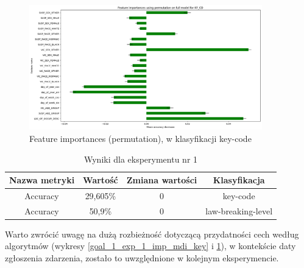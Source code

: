 \documentclass{classrep}
\begin{document}
{{{{                    \begin{figure}[!htbp]
                        \centering
                        \includegraphics[width=0.9\textwidth]{img/5.1.3/1/Feature importances using permutation on full model for KY_CD.png}
                        \caption{Feature importances (permutation), w klasyfikacji key-code}
                        \label{goal_1_exp_1_imp_perm_key}
                    \end{figure}
                    
                    \begin{table}
                    \centering
                     \begin{tabular}{|c|c|c|c|}
                            \hline
                          Nazwa metryki & Wartość & Zmiana wartości & Klasyfikacja \\ \hline
                            Accuracy &  29,605\% & 0 & key-code\\ \hline
                            Accuracy &  50,9\% & 0 & law-breaking-level\\ \hline
                        \end{tabular}
                        \caption{Wyniki dla eksperymentu nr 1}
                        \label{goal_1_exp_1_results}
                     \end{table}
                     \FloatBarrier
                     
                     Warto zwrócić uwagę na dużą rozbieżność dotyczącą przydatności cech według algorytmów (wykresy \ref{goal_1_exp_1_imp_mdi_key} i \ref{goal_1_exp_1_imp_perm_key}), w kontekście daty zgłoszenia zdarzenia, zostało to uwzględnione w kolejnym eksperymencie.
                }
}}}
\end{document}
